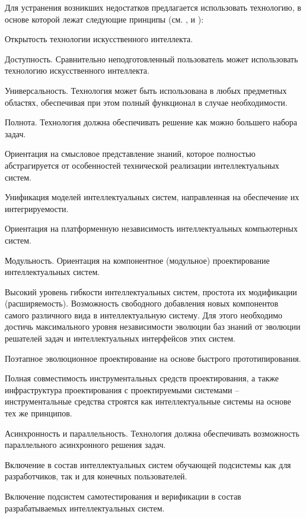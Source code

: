 \begin{partbacktext}
Для устранения возникших недостатков предлагается использовать технологию, в основе которой лежат следующие принципы (см. ,  и ):
\begin{textitemize}
	\item{Открытость технологии искусственного интеллекта.}
	\item{Доступность. Сравнительно неподготовленный пользователь может использовать технологию искусственного интеллекта.}
	\item{Универсальность. Технология может быть использована в любых предметных областях, обеспечивая при этом полный функционал в случае необходимости.}
	\item{Полнота. Технология должна обеспечивать решение как можно большего набора задач.}
	\item{Ориентация на смысловое представление знаний, которое полностью абстрагируется от	особенностей технической реализации интеллектуальных систем.}
	\item{Унификация моделей интеллектуальных систем, направленная на обеспечение их интегрируемости.}
	\item{Ориентация на платформенную независимость интеллектуальных компьютерных систем.}
	\item{Модульность. Ориентация на компонентное (модульное) проектирование интеллектуальных систем.}
	\item{Высокий уровень гибкости интеллектуальных систем, простота их модификации (расширяемость). Возможность свободного добавления новых компонентов самого различного вида в интеллектуальную систему. Для этого необходимо достичь максимального уровня независимости эволюции баз знаний от эволюции решателей задач и интеллектуальных интерфейсов этих систем.}
	\item{Поэтапное эволюционное проектирование на основе быстрого прототипирования.}
	\item{Полная совместимость инструментальных средств проектирования, а также инфраструктура проектирования с проектируемыми системами – инструментальные средства строятся как интеллектуальные системы на основе тех же принципов.}
	\item{Асинхронность и параллельность. Технология должна обеспечивать возможность параллельного асинхронного решения задач.}
	\item{Включение в состав интеллектуальных систем обучающей подсистемы как для разработчиков, так и для конечных пользователей.}
	\item{Включение подсистем самотестирования и верификации в состав разрабатываемых интеллектуальных систем.}
\end{textitemize}


\end{partbacktext}
